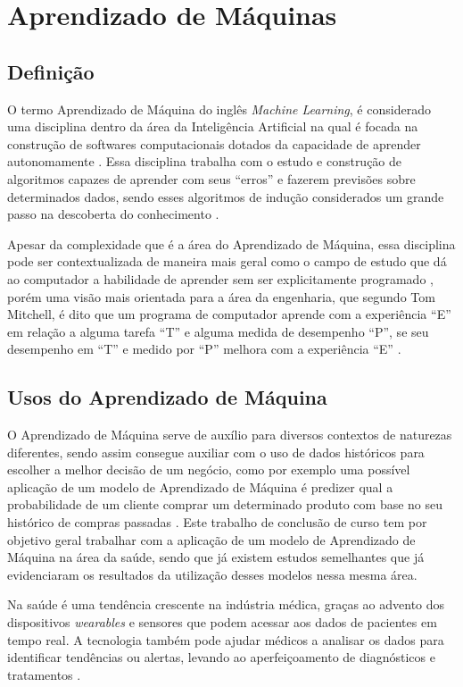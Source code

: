 \chapter{Aprendizado de Máquinas}
\section{Definição}
O termo Aprendizado de Máquina do inglês \textit{Machine Learning}, é considerado uma disciplina dentro da área da Inteligência Artificial na qual é focada na construção de softwares computacionais dotados da capacidade de aprender autonomamente \cite{Hosch}. Essa disciplina trabalha com o estudo e construção de algoritmos capazes de aprender com seus “erros” e fazerem previsões sobre determinados dados, sendo esses algoritmos de indução considerados um grande passo na descoberta do conhecimento \cite{Kohavi}.

Apesar da complexidade que é a área do Aprendizado de Máquina, essa disciplina pode ser contextualizada de maneira mais geral como o campo de estudo que dá ao computador a habilidade de aprender sem ser explicitamente programado \cite{Arthur}, porém uma visão mais orientada para a área da engenharia, que segundo Tom Mitchell, é dito que um programa de computador aprende com a experiência “E” em relação a alguma tarefa “T” e alguma medida de desempenho “P”, se seu desempenho em “T” e medido por “P” melhora com a experiência “E” \cite{Tom}.

\section{Usos do Aprendizado de Máquina}
O Aprendizado de Máquina serve de auxílio para diversos contextos de naturezas diferentes, sendo assim consegue auxiliar com o uso de dados históricos para escolher a melhor decisão de um negócio, como por exemplo uma possível aplicação de um modelo de Aprendizado de Máquina é predizer qual a probabilidade de um cliente comprar um determinado produto com base no seu histórico de compras passadas \cite{Amazon}. Este trabalho de conclusão de curso tem por objetivo geral trabalhar com a aplicação de um modelo de Aprendizado de Máquina na área da saúde, sendo que já existem estudos semelhantes que já evidenciaram os resultados da utilização desses modelos nessa mesma área.

Na saúde é uma tendência crescente na indústria médica, graças ao advento dos dispositivos \textit{wearables} e sensores que podem acessar aos dados de pacientes em tempo real. A tecnologia também pode ajudar médicos a analisar os dados para identificar tendências ou alertas, levando ao aperfeiçoamento de diagnósticos e tratamentos \cite{Sas}.

